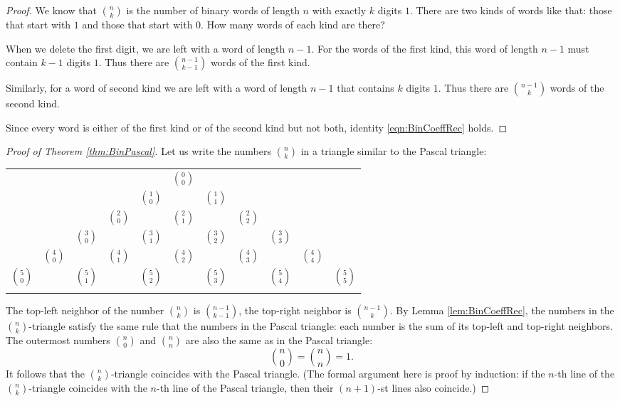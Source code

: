 \begin{proof}
We know that $\binom{n}{k}$ is the number of binary words of length $n$ with exactly $k$ digits $1$.
There are two kinds of words like that: those that start with $1$ and those that start with $0$.
How many words of each kind are there?

When we delete the first digit, we are left with a word of length $n-1$.
For the words of the first kind, this word of length $n-1$ must contain $k-1$ digits $1$.
Thus there are $\binom{n-1}{k-1}$ words of the first kind.

Similarly, for a word of second kind we are left with a word of length $n-1$ that contains $k$ digits $1$.
Thus there are $\binom{n-1}k$ words of the second kind.

Since every word is either of the first kind or of the second kind but not both,
identity \eqref{eqn:BinCoeffRec} holds.
\end{proof}

\begin{proof}[Proof of Theorem \ref{thm:BinPascal}]
Let us write the numbers $\binom{n}{k}$ in a triangle similar to the Pascal triangle:
\begin{center}
\begin{tabular}{ccccccccccc}
&    &    &    &    &  $\binom{0}{0}$\\\noalign{\smallskip\smallskip}
&    &    &    &  $\binom{1}{0}$ &    &  $\binom{1}{1}$\\\noalign{\smallskip\smallskip}
&    &    &  $\binom{2}{0}$ &    &  $\binom{2}{1}$ &    &  $\binom{2}{2}$\\\noalign{\smallskip\smallskip}
&    &  $\binom{3}{0}$ &    &  $\binom{3}{1}$ &    &  $\binom{3}{2}$ &    &  $\binom{3}{3}$\\\noalign{\smallskip\smallskip}
&  $\binom{4}{0}$ &    &  $\binom{4}{1}$ &    &  $\binom{4}{2}$ &    &  $\binom{4}{3}$ &    & $\binom{4}{4}$\\\noalign{\smallskip\smallskip}
$\binom{5}{0}$ &   &  $\binom{5}{1}$ &    & $\binom{5}{2}$ &    & $\binom{5}{3}$ &    &  $\binom{5}{4}$ &   & $\binom{5}{5}$\\\noalign{\smallskip\smallskip}
\end{tabular}
\end{center}
The top-left neighbor of the number $\binom{n}{k}$ is $\binom{n-1}{k-1}$, the top-right neighbor is $\binom{n-1}{k}$.
By Lemma \ref{lem:BinCoeffRec}, the numbers in the $\binom{n}{k}$-triangle satisfy the same rule that the numbers in the Pascal triangle:
each number is the sum of its top-left and top-right neighbors.
The outermost numbers $\binom{n}{0}$ and $\binom{n}{n}$ are also the same as in the Pascal triangle:
\[
\binom{n}{0} = \binom{n}{n} = 1.
\]
It follows that the $\binom{n}{k}$-triangle coincides with the Pascal triangle.
(The formal argument here is proof by induction:
if the $n$-th line of the $\binom{n}{k}$-triangle coincides with the $n$-th line of the Pascal triangle,
then their $(n+1)$-st lines also coincide.)
\end{proof}



